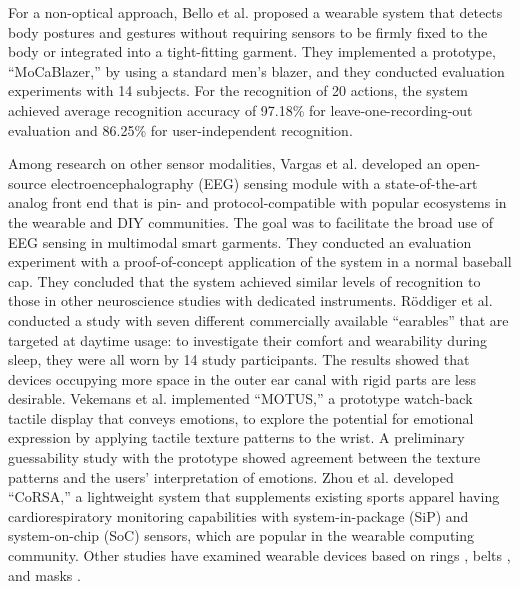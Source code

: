 \documentclass{ieeeaccess}
\begin{document}
For a non-optical approach, Bello et al. \cite{MoCapaci} proposed a wearable system that detects body postures and gestures without requiring sensors to be firmly fixed to the body or integrated into a tight-fitting garment. They implemented a prototype, ``MoCaBlazer,'' by using a standard men's blazer, and they conducted evaluation experiments with 14 subjects. For the recognition of 20 actions, the system achieved average recognition accuracy of 97.18\% for leave-one-recording-out evaluation and 86.25\% for user-independent recognition.\par

Among research on other sensor modalities, Vargas et al. \cite{Brainwear} developed an open-source electroencephalography (EEG) sensing module with a state-of-the-art analog front end that is pin- and protocol-compatible with popular ecosystems in the wearable and DIY communities. The goal was to facilitate the broad use of EEG sensing in multimodal smart garments. They conducted an evaluation experiment with a proof-of-concept application of the system in a normal baseball cap. They concluded that the system achieved similar levels of recognition to those in other neuroscience studies with dedicated instruments. R\"{o}ddiger et al. \cite{earables} conducted a study with seven different commercially available ``earables'' that are targeted at daytime usage: to investigate their comfort and wearability during sleep, they were all worn by 14 study participants. The results showed that devices occupying more space in the outer ear canal with rigid parts are less desirable. Vekemans et al. \cite{MOTUS} implemented ``MOTUS,'' a prototype watch-back tactile display that conveys emotions, to explore the potential for emotional expression by applying tactile texture patterns to the wrist. A preliminary guessability study with the prototype showed agreement between the texture patterns and the users' interpretation of emotions. Zhou et al. \cite{CoRSA} developed ``CoRSA,'' a lightweight system that supplements existing sports apparel having cardiorespiratory monitoring capabilities with system-in-package (SiP) and system-on-chip (SoC) sensors, which are popular in the wearable computing community. Other studies have examined wearable devices based on rings \cite{wearable_ring1, wearable_ring2, TypingRing, ElectroRing}, belts \cite{wearable_belt1, SmartBelt, WaistonBeltX, wearable_belt2}, and masks \cite{wearable_mask1, wearable_mask2, SilentMask, Masquare}.\par
\end{document}

